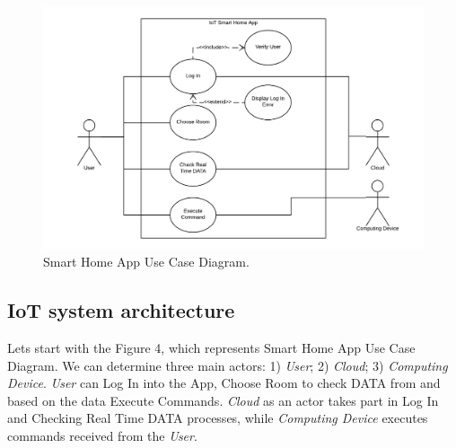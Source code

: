 \documentclass[12pt]{article}
\begin{document}
\begin{figure} [H] %
	\begin{center}
		\includegraphics[width=1\textwidth]{use_case}
		\caption{Smart Home App Use Case Diagram.}
		\label{fig:ref_model}
	\end{center}
\end{figure}
       
\newpage
\subsection{IoT system architecture}

Lets start with the Figure 4, which represents Smart Home App Use Case Diagram. We can determine three main actors: 1) \textit{User}; 2) \textit{Cloud}; 3) \textit{Computing Device}. \textit{User} can Log In into the App, Choose Room to check DATA from and based on the data Execute Commands. \textit{Cloud} as an actor takes part in Log In and Checking Real Time DATA processes, while \textit{Computing Device} executes commands received from the \textit{User}.
\end{document}
